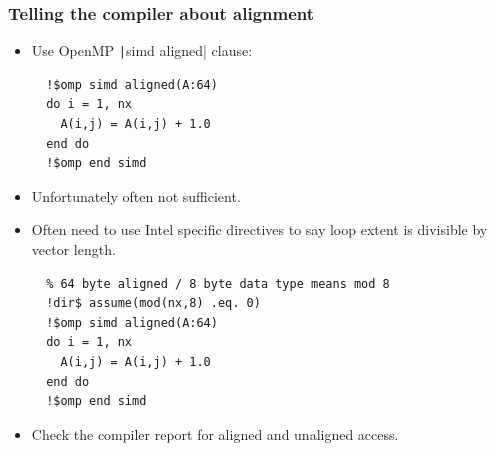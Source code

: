 \documentclass{beamer}
\begin{document}
\begin{frame}[fragile]
\frametitle{Telling the compiler about alignment}
\begin{itemize}
  \item Use OpenMP \texttt|simd aligned| clause:
  \begin{verbatim}
  !$omp simd aligned(A:64)
  do i = 1, nx
    A(i,j) = A(i,j) + 1.0
  end do
  !$omp end simd
  \end{verbatim}
  \pause
  \item Unfortunately often not sufficient.
  \item Often need to use Intel specific directives to say loop extent is divisible by vector length.
  \begin{verbatim}
  % 64 byte aligned / 8 byte data type means mod 8
  !dir$ assume(mod(nx,8) .eq. 0)
  !$omp simd aligned(A:64)
  do i = 1, nx
    A(i,j) = A(i,j) + 1.0
  end do
  !$omp end simd
  \end{verbatim}
  \item Check the compiler report for aligned and unaligned access.
\end{itemize}
\end{frame}
\end{document}
